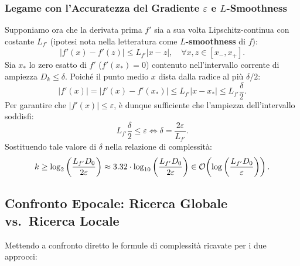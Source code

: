 \subsubsection{Legame con l'Accuratezza del Gradiente $\varepsilon$ e $L$-Smoothness}
Supponiamo ora che la derivata prima $f'$ sia a sua volta Lipschitz-continua con costante $L_{f'}$ (ipotesi nota nella letteratura come \textbf{$L$-smoothness} di $f$):
\begin{equation}
    |f'(x) - f'(z)| \le L_{f'} |x - z|, \quad \forall x, z \in [x_-, x_+].
\end{equation}
Sia $x_*$ lo zero esatto di $f'$ ($f'(x_*) = 0$) contenuto nell'intervallo corrente di ampiezza $D_k \le \delta$. Poich\'e il punto medio $x$ dista dalla radice al pi\`u $\delta/2$:
\begin{equation}
    |f'(x)| = |f'(x) - f'(x_*)| \le L_{f'} |x - x_*| \le L_{f'} \frac{\delta}{2}.
\end{equation}
Per garantire che $|f'(x)| \le \varepsilon$, \`e dunque sufficiente che l'ampiezza dell'intervallo soddisfi:
\begin{equation}
    L_{f'} \frac{\delta}{2} \le \varepsilon \iff \delta = \frac{2\varepsilon}{L_{f'}}.
\end{equation}
Sostituendo tale valore di $\delta$ nella relazione di complessit\`a:
\begin{equation}
    k \ge \log_2\left( \frac{L_{f'} D_0}{2\varepsilon} \right) \approx 3.32 \cdot \log_{10}\left( \frac{L_{f'} D_0}{2\varepsilon} \right) \in \mathcal{O}\!\left(\log\left(\frac{L_{f'} D_0}{\varepsilon}\right)\right).
    \label{eq:complessita-dicotomica-gradiente}
\end{equation}

\subsection{Confronto Epocale: Ricerca Globale vs.\ Ricerca Locale}
Mettendo a confronto diretto le formule di complessit\`a ricavate per i due approcci:

